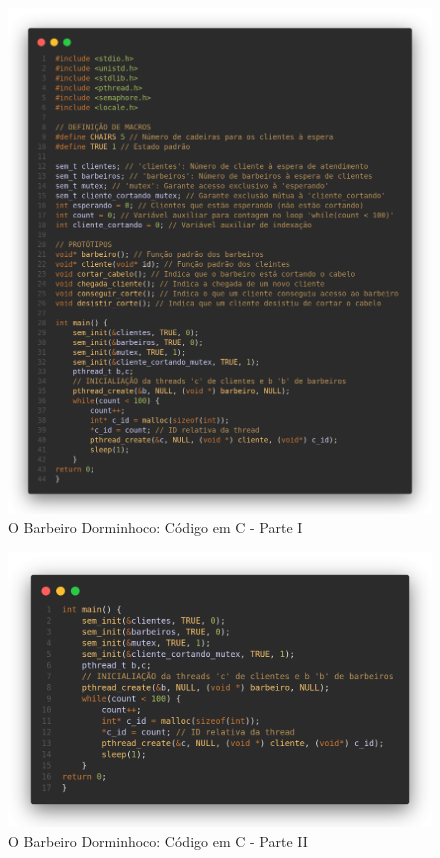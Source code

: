 \documentclass[
	12pt,				%
	openright,			%
	oneside,			%
	a4paper,			%
	chapter=TITLE,		%
	english,			%
	french,				%
	spanish,			%
	brazil				%
	]{abntex2}
\theoremstyle{definition}
\begin{document}
\begin{figure}[h]
    \centering
    \includegraphics[width=1.0\textwidth]{imagens/barbeiro_1.png}
    \caption{O Barbeiro Dorminhoco: Código em C - Parte I}
    \label{fig:barbeiro_1}
\end{figure}

\begin{figure}[h]
    \centering
    \includegraphics[width=1.0\textwidth]{imagens/barbeiro_2.png}
    \caption{O Barbeiro Dorminhoco: Código em C - Parte II}
    \label{fig:barbeiro_2}
\end{figure}
\end{document}

